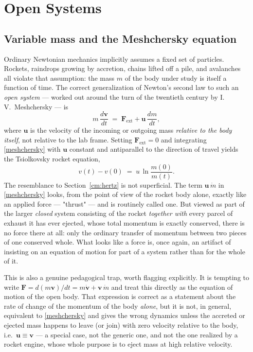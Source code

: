 \chapter{Open Systems}
\label{open}

\section{Variable mass and the Meshchersky equation}

Ordinary Newtonian mechanics implicitly assumes a fixed set of
particles. Rockets, raindrops growing by accretion, chains lifted
off a pile, and avalanches all violate that assumption: the mass $m$
of the body under study is itself a function of time. The correct
generalization of Newton's second law to such an \emph{open system}
--- worked out around the turn of the twentieth century by
I.\,V.\ Meshchersky --- is
\begin{equation}
  m\,\frac{d\mathbf v}{dt} \;=\; \mathbf F_{\mathrm{ext}}
  + \mathbf u\,\frac{dm}{dt} ,
  \label{meshchersky}
\end{equation}
where $\mathbf u$ is the velocity of the incoming or outgoing mass
\emph{relative to the body itself}, not relative to the lab frame.
Setting $\mathbf F_{\mathrm{ext}}=0$ and integrating
\eqref{meshchersky} with $\mathbf u$ constant and antiparallel to
the direction of travel yields the Tsiolkovsky rocket equation,
\begin{equation}
  v(t) - v(0) \;=\; u\,\ln\frac{m(0)}{m(t)} .
  \label{tsiolkovsky}
\end{equation}
The resemblance to Section~\ref{cm:hertz} is not superficial. The
term $\mathbf u\,\dot m$ in \eqref{meshchersky} looks, from the
point of view of the rocket body alone, exactly like an applied
force --- "thrust" --- and is routinely called one. But viewed as
part of the larger \emph{closed} system consisting of the rocket
\emph{together with} every parcel of exhaust it has ever ejected,
whose total momentum is exactly conserved, there is no force there
at all: only the ordinary transfer of momentum between two pieces of
one conserved whole. What looks like a force is, once again, an
artifact of insisting on an equation of motion for part of a system
rather than for the whole of it.

This is also a genuine pedagogical trap, worth flagging explicitly.
It is tempting to write $\mathbf F = d(m\mathbf v)/dt = m\dot{\mathbf
v} + \mathbf v\,\dot m$ and treat this directly as the equation of
motion of the open body. That expression is correct as a statement
about the rate of change of the momentum of the body \emph{alone},
but it is not, in general, equivalent to \eqref{meshchersky} and
gives the wrong dynamics unless the accreted or ejected mass happens
to leave (or join) with zero velocity relative to the body, i.e.\
$\mathbf u \equiv \mathbf v$ --- a special case, not the generic one,
and not the one realized by a rocket engine, whose whole purpose is
to eject mass at high relative velocity.

